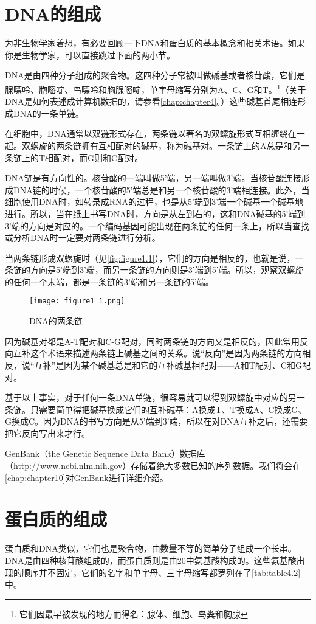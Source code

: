 \section{DNA的组成}
为非生物学家着想，有必要回顾一下DNA和蛋白质的基本概念和相关术语。如果你是生物学家，可以直接跳过下面的两小节。

DNA是由四种分子组成的聚合物。这四种分子常被叫做碱基或者核苷酸，它们是腺嘌呤、胞嘧啶、鸟嘌呤和胸腺嘧啶，单字母缩写分别为A、C、G和T。\footnote{它们因最早被发现的地方而得名：腺体、细胞、鸟粪和胸腺}（关于DNA是如何表述成计算机数据的，请参看\autoref{chap:chapter4}。）这些碱基首尾相连形成DNA的一条单链。

在细胞中，DNA通常以双链形式存在，两条链以著名的双螺旋形式互相缠绕在一起。双螺旋的两条链拥有互相配对的碱基，称为碱基对。一条链上的A总是和另一条链上的T相配对，而G则和C配对。

DNA链是有方向性的。核苷酸的一端叫做5'端，另一端叫做3'端。当核苷酸连接形成DNA链的时候，一个核苷酸的5'端总是和另一个核苷酸的3'端相连接。此外，当细胞使用DNA时，如转录成RNA的过程，也是从5'端到3'端一个碱基一个碱基地进行。所以，当在纸上书写DNA时，方向是从左到右的，这和DNA碱基的5'端到3'端的方向是对应的。一个编码基因可能出现在两条链的任何一条上，所以当查找或分析DNA时一定要对两条链进行分析。

当两条链形成双螺旋时（见\autoref{fig:figure1.1}），它们的方向是相反的，也就是说，一条链的方向是5'端到3'端，而另一条链的方向则是3'端到5'端。所以，观察双螺旋的任何一个末端，都是一条链的3'端和另一条链的5'端。

\begin{figure}
  \centering
  \texttt{[image: figure1\_1.png]}
  \caption{DNA的两条链}
  \label{fig:figure1.1}
\end{figure}

因为碱基对都是A-T配对和C-G配对，同时两条链的方向又是相反的，因此常用反向互补这个术语来描述两条链上碱基之间的关系。说“反向”是因为两条链的方向相反，说“互补”是因为某个碱基总是和它的互补碱基相配对——A和T配对、C和G配对。

基于以上事实，对于任何一条DNA单链，很容易就可以得到双螺旋中对应的另一条链。只需要简单得把碱基换成它们的互补碱基：A换成T、T换成A、C换成G、G换成C。因为DNA的书写方向是从5'端到3'端，所以在对DNA互补之后，还需要把它反向写出来才行。

GenBank（the Genetic Sequence Data Bank）数据库（\href{http://www.ncbi.nlm.nih.gov}{http://www.ncbi.nlm.nih.gov}）存储着绝大多数已知的序列数据。我们将会在\autoref{chap:chapter10}对GenBank进行详细介绍。

\section{蛋白质的组成}
  蛋白质和DNA类似，它们也是聚合物，由数量不等的简单分子组成一个长串。DNA是由四种核苷酸组成的，而蛋白质则是由20中氨基酸构成的。这些氨基酸出现的顺序并不固定，它们的名字和单字母、三字母缩写都罗列在了\autoref{tab:table4.2}中。

